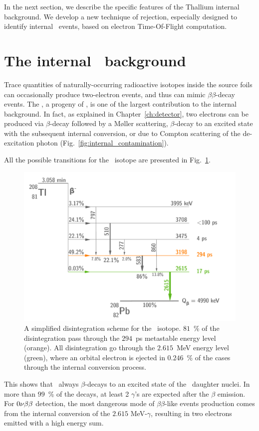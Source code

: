 In the next section, we describe the specific features of the Thallium internal background.
We develop a new technique of rejection, especially designed to identify internal \Tl\ events, based on electron Time-Of-Flight computation.

\section{The internal \Tl\ background}

Trace quantities of naturally-occurring radioactive isotopes inside the source foils can occasionally produce two-electron events, and thus can mimic $\beta\beta$-decay events.
The \Tl, a progeny of \Th, is one of the largest contribution to the internal background.
In fact, as explained in Chapter~\ref{ch:detector}, two electrons can be produced via $\beta$-decay followed by a M\o{}ller scattering, $\beta$-decay to an excited state with the subsequent internal conversion, or due to Compton scattering of the de-excitation photon (Fig.~\ref{fig:internal_contamination}).

All the possible transitions for the \Tl\ isotope are presented in Fig.~\ref{fig:Tl_scheme}.
\begin{figure}[!h]
  \centering
  \includegraphics[width=13cm]{timedifference/fig_timediff/Tl_decay_scheme.pdf}
  \caption{A simplified disintegration scheme for the \Tl\ isotope.
    $81$~\% of the disintegration pass through the $294$~ps metastable energy level (orange).
    All disintegration go through the $2.615$~MeV energy level (green), where an orbital electron is ejected in $0.246$~\% of the cases through the internal conversion process.
  \label{fig:Tl_scheme}}
\end{figure}
This shows that \Tl\ always $\beta$-decays to an excited state of the \Pb\ daughter nuclei.
In more than $99$~\% of the decays, at least 2 $\gamma$'s are expected after the $\beta$ emission.
For $0\nu\beta\beta$ detection, the most dangerous mode of $\beta\beta$-like events production comes from the internal conversion of the $2.615$ MeV-$\gamma$, resulting in two electrons emitted with a high energy sum.

